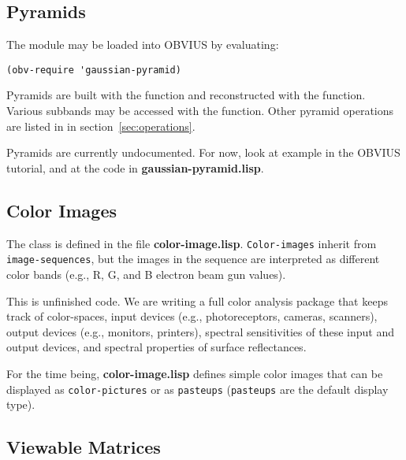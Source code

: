 
\subsection{Pyramids}
\label{sec:pyramid}

The  module may be loaded into OBVIUS by evaluating:
\begin{verbatim}
(obv-require 'gaussian-pyramid)
\end{verbatim}
Pyramids are built with the function  and
reconstructed with the  function.  Various subbands may
be accessed with the  function.  Other pyramid
operations are listed in in section~\ref{sec:operations}.

Pyramids are currently undocumented.  For now, look at example in the
OBVIUS tutorial, and at the code in {\bf gaussian-pyramid.lisp}.


\subsection{Color Images}
\label{sec:color-image}

The  class is defined in the file {\bf
color-image.lisp}.  {\tt Color-images} inherit from {\tt
image-sequences}, but the images in the sequence are interpreted as
different color bands (e.g., R, G, and B electron beam gun values).

This is unfinished code.  We are writing a full color analysis package
that keeps track of color-spaces, input devices (e.g., photoreceptors,
cameras, scanners), output devices (e.g., monitors, printers),
spectral sensitivities of these input and output devices, and spectral
properties of surface reflectances.  

For the time being, {\bf color-image.lisp} defines simple color images
that can be displayed as {\tt color-pictures} or as {\tt pasteups}
({\tt pasteups} are the default display type).


\subsection{Viewable Matrices}
\label{sec:viewable-matrix}

